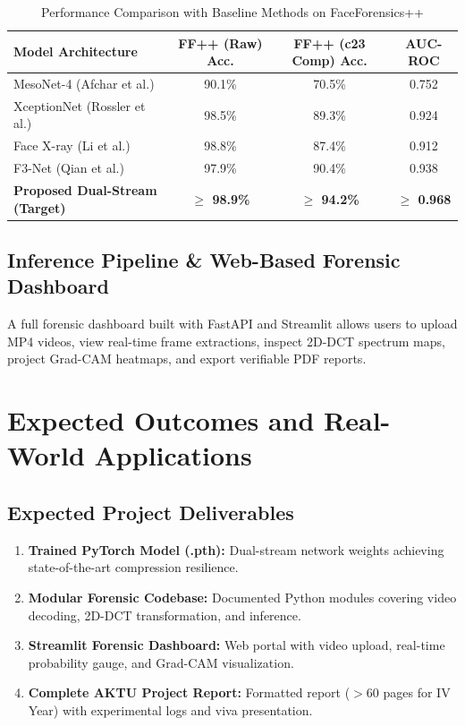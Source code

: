 \documentclass[12pt,a4paper]{report}
\begin{document}
\begin{table}[htbp]
\centering
\small
\caption{Performance Comparison with Baseline Methods on FaceForensics++}
\label{tab:benchmarks}
\begin{tabular}{p{4.5cm} c c c}
\toprule
\textbf{Model Architecture} & \textbf{FF++ (Raw) Acc.} & \textbf{FF++ (c23 Comp) Acc.} & \textbf{AUC-ROC} \\
\midrule
MesoNet-4 (Afchar et al.) & 90.1\% & 70.5\% & 0.752 \\
XceptionNet (Rossler et al.) & 98.5\% & 89.3\% & 0.924 \\
Face X-ray (Li et al.) & 98.8\% & 87.4\% & 0.912 \\
F3-Net (Qian et al.) & 97.9\% & 90.4\% & 0.938 \\
\midrule
\textbf{Proposed Dual-Stream (Target)} & \textbf{$\ge$ 98.9\%} & \textbf{$\ge$ 94.2\%} & \textbf{$\ge$ 0.968} \\
\bottomrule
\end{tabular}
\end{table}

\section{Inference Pipeline \& Web-Based Forensic Dashboard}
A full forensic dashboard built with FastAPI and Streamlit allows users to upload MP4 videos, view real-time frame extractions, inspect 2D-DCT spectrum maps, project Grad-CAM heatmaps, and export verifiable PDF reports.

\newpage

\chapter{Expected Outcomes and Real-World Applications}

\section{Expected Project Deliverables}
\begin{enumerate}
    \item \textbf{Trained PyTorch Model (.pth):} Dual-stream network weights achieving state-of-the-art compression resilience.
    \item \textbf{Modular Forensic Codebase:} Documented Python modules covering video decoding, 2D-DCT transformation, and inference.
    \item \textbf{Streamlit Forensic Dashboard:} Web portal with video upload, real-time probability gauge, and Grad-CAM visualization.
    \item \textbf{Complete AKTU Project Report:} Formatted report ($>60$ pages for IV Year) with experimental logs and viva presentation.
\end{enumerate}
\end{document}
